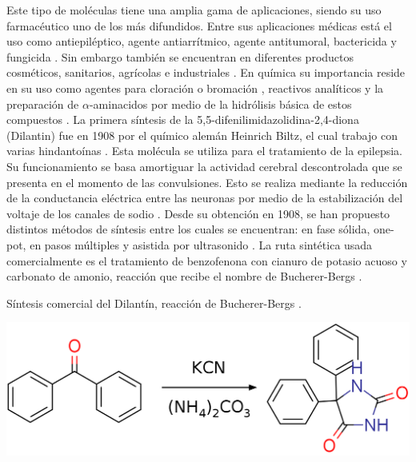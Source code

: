 \documentclass[fleqn,10pt]{SelfArx}
\begin{document}
Este tipo de moléculas tiene una amplia gama de aplicaciones, siendo su uso farmacéutico uno de los más difundidos. Entre sus aplicaciones médicas está el uso como antiepiléptico, agente antiarrítmico, agente antitumoral, bactericida y fungicida \cite{safari2010}\cite{ildiz2012}\cite{hayward1983}. Sin embargo también se encuentran en diferentes productos cosméticos, sanitarios, agrícolas e industriales \cite{kroschwitz2007}. En química su importancia reside en su uso como agentes para cloración o bromación \cite{m2015}, reactivos analíticos \cite{kroschwitz2007} y la preparación de $\alpha$-aminacidos por medio de la hidrólisis básica de estos compuestos \cite{m2015}. La primera síntesis de la 5,5-difenilimidazolidina-2,4-diona (Dilantin) fue en 1908 por el químico alemán Heinrich Biltz, el cual trabajo con varias hindantoínas \cite{hayward1983}\cite{aicardi2007}. Esta molécula se utiliza para el tratamiento de la epilepsia. Su funcionamiento se basa amortiguar la actividad cerebral descontrolada que se presenta en el momento de las convulsiones. Esto se realiza mediante la reducción de la conductancia eléctrica entre las neuronas por medio de la estabilización del voltaje de los canales de sodio \cite{asif2015}. Desde su obtención en 1908, se han propuesto distintos métodos de síntesis entre los cuales se encuentran: en fase sólida, one-pot, en pasos múltiples y asistida por ultrasonido \cite{safari2010}. La ruta sintética usada comercialmente es el tratamiento de benzofenona con cianuro de potasio acuoso y carbonato de amonio, reacci\'on que recibe el nombre de Bucherer-Bergs \cite{hayward1983}\cite{li2013}\cite{kadam2007}. 
\begin{scheme}[h]
	\centering
	\caption{S\'intesis comercial del Dilant\'in, reacci\'on de Bucherer-Bergs \cite{li2013}.}
	\includegraphics[width=0.8\linewidth]{structures/bucherer.png}
\end{scheme}
\end{document}
